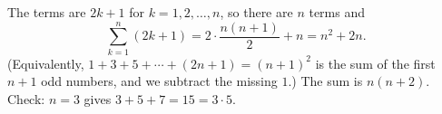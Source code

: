 The terms are $2k+1$ for $k=1,2,\dots,n$, so there are $n$ terms and
\[
\sum_{k=1}^{n}(2k+1)=2\cdot\dfrac{n(n+1)}{2}+n=n^2+2n .
\]
(Equivalently, $1+3+5+\cdots+(2n+1)=(n+1)^2$ is the sum of the first $n+1$ odd numbers, and we subtract the missing $1$.) The sum is $\boxed{n(n+2)}$. Check: $n=3$ gives $3+5+7=15=3\cdot5$.
